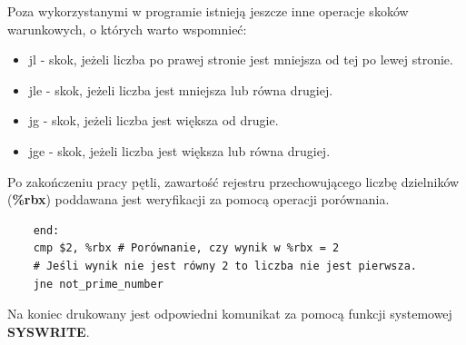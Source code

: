 \documentclass[a4paper,12pt]{article}
\begin{document}
Poza wykorzystanymi w programie istnieją jeszcze inne operacje skoków warunkowych, o których warto wspomnieć:
\begin{itemize}
	\item jl - skok, jeżeli liczba po prawej stronie jest mniejsza od tej po lewej stronie.
	\item jle - skok, jeżeli liczba jest mniejsza lub równa drugiej.
	\item jg - skok, jeżeli liczba jest większa od drugie.
	\item jge - skok, jeżeli liczba jest większa lub równa drugiej.
\end{itemize}
Po zakończeniu pracy pętli, zawartość rejestru przechowującego liczbę dzielników (\textbf{\%rbx}) poddawana jest weryfikacji za pomocą operacji porównania.
\begin{verbatim}
	end:
	cmp $2, %rbx # Porównanie, czy wynik w %rbx = 2
	# Jeśli wynik nie jest równy 2 to liczba nie jest pierwsza.
	jne not_prime_number
\end{verbatim}
Na koniec drukowany jest odpowiedni komunikat za pomocą funkcji systemowej \textbf{SYSWRITE}.
\end{document}
